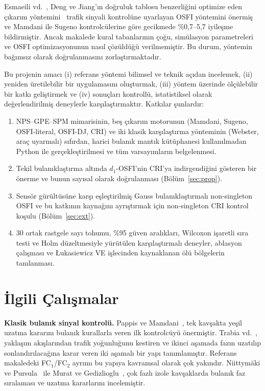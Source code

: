 \documentclass[11pt,a4paper]{article}
\theoremstyle{definition}
\begin{document}
Esmaeili vd.~\cite{esmaeili2025osfi}, Deng ve Jiang'ın doğruluk tablosu benzerliğini optimize eden çıkarım yöntemini~\cite{deng2014osfi} trafik sinyali kontrolüne uyarlayan OSFI yöntemini önermiş ve Mamdani ile Sugeno kontrolcülerine göre gecikmede \%0,7--5,7 iyileşme bildirmiştir. Ancak makalede kural tabanlarının çoğu, simülasyon parametreleri ve OSFI optimizasyonunun nasıl çözüldüğü verilmemiştir. Bu durum, yöntemin bağımsız olarak doğrulanmasını zorlaştırmaktadır.

Bu projenin amacı (i) referans yöntemi bilimsel ve teknik açıdan incelemek, (ii) yeniden üretilebilir bir uygulamasını oluşturmak, (iii) yöntem üzerinde ölçülebilir bir katkı geliştirmek ve (iv) sonuçları kontrollü, istatistiksel olarak değerlendirilmiş deneylerle karşılaştırmaktır. Katkılar şunlardır:
\begin{enumerate}
\item NPS--GPE--SPM mimarisinin, beş çıkarım motorunun (Mamdani, Sugeno, OSFI-literal, OSFI-DJ, CRI) ve iki klasik karşılaştırma yönteminin (Webster, araç uyarmalı) sıfırdan, harici bulanık mantık kütüphanesi kullanılmadan Python ile gerçekleştirilmesi ve tüm varsayımların belgelenmesi.
\item Tekil bulanıklaştırma altında $d_1$-OSFI'nin CRI'ya indirgendiğini gösteren bir önerme ve bunun sayısal olarak doğrulanması (Bölüm~\ref{sec:prop}).
\item Sensör gürültüsüne karşı eşleştirilmiş Gauss bulanıklaştırmalı non-singleton OSFI ve bu katkının kaynağını ayrıştırmak için non-singleton CRI kontrol koşulu (Bölüm~\ref{sec:ext}).
\item 30 ortak rastgele sayı tohumu, \%95 güven aralıkları, Wilcoxon işaretli sıra testi ve Holm düzeltmesiyle yürütülen karşılaştırmalı deneyler, ablasyon çalışması ve Łukasiewicz VE işlecinden kaynaklanan ölü bölgelerin tanılanması.
\end{enumerate}

\section{İlgili Çalışmalar}
\label{sec:related}

\textbf{Klasik bulanık sinyal kontrolü.} Pappis ve Mamdani~\cite{pappis1977}, tek kavşakta yeşil uzatma kararını bulanık kurallarla veren ilk kontrolcüyü önermiştir. Trabia vd.~\cite{trabia1999}, yaklaşım akışlarından trafik yoğunluğunu kestiren ve ikinci aşamada fazın uzatılıp sonlandırılacağına karar veren iki aşamalı bir yapı tanımlamıştır. Referans makaledeki FC$_1$/FC$_2$ ayrımı bu yapıya kavramsal olarak çok yakındır. Niittymäki ve Pursula~\cite{niittymaki2000} ile Murat ve Gedizlioglu~\cite{murat2005}, çok fazlı izole kavşaklarda bulanık faz sıralaması ve uzatma kararlarını incelemiştir.
\end{document}
